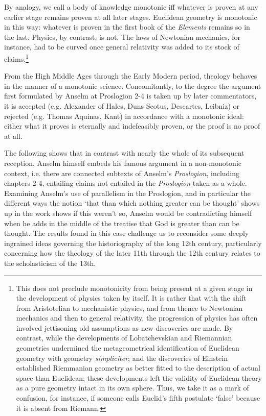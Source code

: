 \documentclass[]{amsart}
\begin{document}
By analogy, we call a body of knowledge monotonic iff whatever is proven at any earlier stage remains proven at all later stages. Euclidean geometry is monotonic in this way: whatever is proven in the first book of the \textit{Elements} remains so in the last. Physics, by contrast, is not. The laws of Newtonian mechanics, for instance, had to be curved once general relativity was added to its stock of claims.\footnote{This does not preclude monotonicity from being present at a given stage in the development of physics taken by itself. It is rather that with the shift from Aristotelian to mechanistic physics, and from thence to Newtonian mechanics and then to general relativity, the progression of physics has often involved jettisoning old assumptions as new discoveries are made. By contrast, while the developments of Lobatchevskian and Riemannian geometries undermined the metageometrical identification of Euclidean geometry with geometry \textit{simpliciter}; and the discoveries of Einstein established Riemmanian geometry as better fitted to the description of actual space than Euclidean; these developments left the validity of Euclidean theory as a pure geometry intact in its own sphere. Thus, we take it as a mark of confusion, for instance, if someone calls Euclid's fifth postulate `false' because it is absent from Riemann.} 

From the High Middle Ages through the Early Modern period, theology behaves in the manner of a monotonic science. Concomitantly, to the degree the argument first formulated by Anselm at Proslogion 2-4 is taken up by later commentators, it is accepted (e.g. Alexander of Hales, Duns Scotus, Descartes, Leibniz) or rejected (e.g. Thomas Aquinas, Kant) in accordance with a monotonic ideal: either what it proves is eternally and indefeasibly proven, or the proof is no proof at all.

The following shows that in contrast with nearly the whole of its subsequent reception, Anselm himself embeds his famous argument in a non-monotonic context, i.e. there are connected subtexts of Anselm's \textit{Proslogion}, including chapters 2-4, entailing claims not entailed in the \textit{Proslogion} taken as a whole. Examining Anselm's use of parallelism in the Proslogion, and in particular the different ways the notion `that than which nothing greater can be thought' shows up in the work shows if this weren't so, Anselm would be contradicting himself when he adds in the middle of the treatise that God is greater than can be thought.  The results found in this case challenge us to reconsider some deeply ingrained ideas governing the historiography of the long 12th century, particularly concerning how the theology of the later 11th through the 12th century relates to the scholasticism of the 13th.
\end{document}
